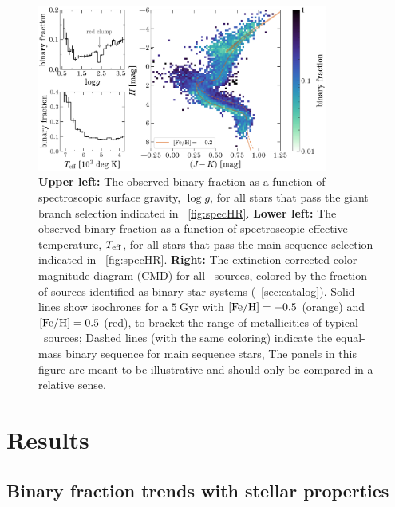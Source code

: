 \documentclass[modern]{aastex63}
\begin{document}
\begin{figure}[!t]
    \begin{center}
    \includegraphics[width=0.85\textwidth]{binary-fraction.pdf}
    \end{center}
    \caption{%
    \textbf{Upper left:} The observed binary fraction as a function of
    spectroscopic surface gravity, $\log g$, for all stars that pass the
    giant branch selection indicated in \figurename~\ref{fig:specHR}.
    \textbf{Lower left:} The observed binary fraction as a function of
    spectroscopic effective temperature, $T_{\rm eff}$, for all stars that pass
    the main sequence selection indicated in \figurename~\ref{fig:specHR}.
    \textbf{Right:} The extinction-corrected  color-magnitude
    diagram (CMD) for all \apogee\ sources, colored by the fraction of sources
    identified as binary-star systems (\sectionname~\ref{sec:catalog}).
    Solid lines show  isochrones for a $5~\mathrm{Gyr}$ with
    ${[{\rm Fe}/{\rm H}]} = -0.5$ (orange) and ${[{\rm Fe}/{\rm H}]} = 0.5$ (red), to bracket the range of
    metallicities of typical \apogee\ sources; Dashed lines (with the same
    coloring) indicate the equal-mass binary sequence for main sequence stars,
    The panels in this figure are meant to be illustrative and should only be
    compared in a relative sense.
    \label{fig:binary-CMD}
    }
\end{figure}


\section{Results} \label{sec:results}

\subsection{Binary fraction trends with stellar properties}
\end{document}
